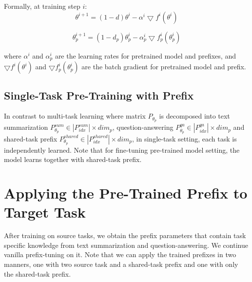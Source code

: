 Formally, at training step $i$:
\begin{equation}
\theta^{i+1} = (1-d)\theta^{i} - \alpha ^{i}\bigtriangledown f^{i}(\theta^{i})
\end{equation}

\begin{equation}
\theta^{i+1}_{p} = (1-d_{p})\theta^{i}_{p} - \alpha ^{i}_{p}\bigtriangledown f^{i}_{p}(\theta^{i}_{p})
\end{equation}

where $\alpha^{i}$ and $\alpha^{i}_{p}$ are the learning rates for pretrained model and prefixes, and $\bigtriangledown f^{i}(\theta^{i})$ and $\bigtriangledown f^{i}_{p}(\theta^{i}_{p})$ are the batch gradient for pretrained model and prefix.






\subsection{Single-Task Pre-Training with Prefix}
In contrast to multi-task learning where matrix $P_{\theta_{p}}$ is decomposed into text summarization  $P_{\theta_{p}}^{sum} \in |P_{idx}^{sum}| \times dim_{p} $, question-answering $P_{\theta_{p}}^{qa} \in |P_{idx}^{qa}| \times dim_{p}$ and shared-task prefix $P_{\theta_{p}}^{shared} \in |P_{idx}^{shared}| \times dim_{p}$, in single-task setting, each task is independently learned. Note that for fine-tuning pre-trained model setting, the model learns together with shared-task prefix.



\section{Applying the Pre-Trained Prefix to Target Task}
After training on source tasks, we obtain the prefix parameters that contain task specific knowledge from text summarization and question-answering. We continue vanilla prefix-tuning on it. Note that we can apply the trained prefixes in two manners, one with two source task and a shared-task prefix and one with only the shared-task prefix.